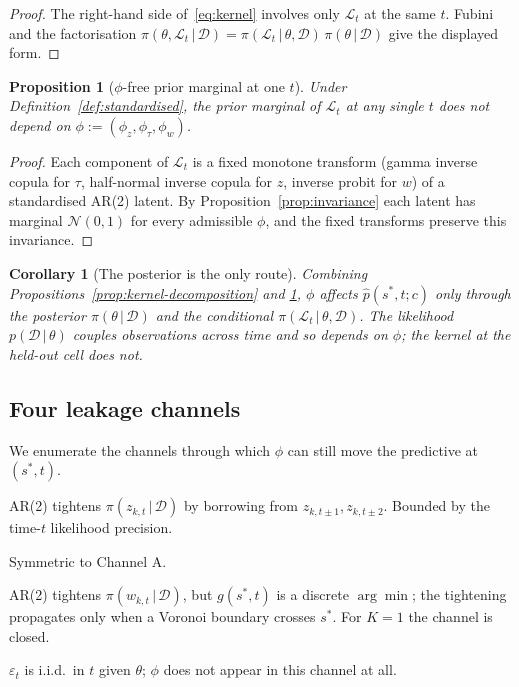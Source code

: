 \documentclass[11pt]{article}
\newtheorem{proposition}{Proposition}
\newtheorem{corollary}{Corollary}
\theoremstyle{definition}
\newcommand{\Norm}{\mathcal{N}}
\newcommand{\D}{\mathcal{D}}
\newcommand{\Ltot}{\mathcal{L}}
\newcommand{\given}{\,\vert\,}
\begin{document}
\begin{proof}
The right-hand side of~\eqref{eq:kernel} involves only $\Ltot_t$ at
the same $t$. Fubini and the factorisation
$\pi(\theta, \Ltot_t \given \D) = \pi(\Ltot_t \given \theta, \D)\,
\pi(\theta \given \D)$ give the displayed form.
\end{proof}

\begin{proposition}[$\phi$-free prior marginal at one $t$]
\label{prop:phi-free}
Under Definition~\ref{def:standardised}, the \emph{prior} marginal of
$\Ltot_t$ at any single $t$ does not depend on
$\phi := (\phi_z, \phi_\tau, \phi_w)$.
\end{proposition}

\begin{proof}
Each component of $\Ltot_t$ is a fixed monotone transform (gamma
inverse copula for $\tau$, half-normal inverse copula for $z$, inverse
probit for $w$) of a standardised AR(2) latent. By
Proposition~\ref{prop:invariance} each latent has marginal
$\Norm(0,1)$ for every admissible $\phi$, and the fixed transforms
preserve this invariance.
\end{proof}

\begin{corollary}[The posterior is the only route]
\label{cor:posterior-route}
Combining Propositions~\ref{prop:kernel-decomposition} and
\ref{prop:phi-free}, $\phi$ affects $\hat p(s^*, t; c)$ only through
the posterior $\pi(\theta \given \D)$ and the conditional
$\pi(\Ltot_t \given \theta, \D)$. The likelihood $p(\D \given \theta)$
couples observations across time and so depends on $\phi$; the kernel
at the held-out cell does not.
\end{corollary}

\subsection{Four leakage channels}

We enumerate the channels through which $\phi$ can still move the
predictive at $(s^*, t)$.

\begin{description}[leftmargin=2em, itemsep=0.25em]
  \item[Channel A: $z_{g, t}$ via temporal pooling.] AR(2) tightens
    $\pi(z_{k, t} \given \D)$ by borrowing from $z_{k, t \pm 1},
    z_{k, t \pm 2}$. Bounded by the time-$t$ likelihood precision.
  \item[Channel B: $\tau_{g, t}$ via temporal pooling.] Symmetric to
    Channel A.
  \item[Channel C: knot membership $g(s^*, t)$.] AR(2) tightens
    $\pi(w_{k, t} \given \D)$, but $g(s^*, t)$ is a discrete
    $\arg\min$; the tightening propagates only when a Voronoi boundary
    crosses $s^*$. For $K = 1$ the channel is closed.
  \item[Channel D: spatial noise $L_C \varepsilon_t /
    \sqrt{\tau_{g,t}}$.] $\varepsilon_t$ is i.i.d.\ in $t$ given
    $\theta$; $\phi$ does not appear in this channel at all.
\end{description}
\end{document}
